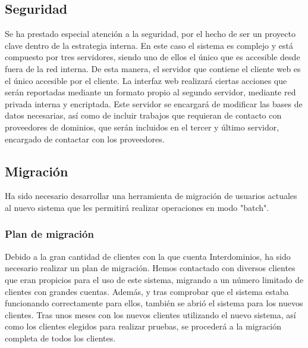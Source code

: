 \documentclass[12pt]{article}
\begin{document}
    \subsection{Seguridad}
      Se ha prestado especial atención a la seguridad, por el hecho de ser un proyecto clave dentro
      de la estrategia interna. En este caso el sistema es complejo y está compuesto por tres
      servidores, siendo uno de ellos el único que es accesible desde fuera de la red interna.
      De esta manera, el servidor que contiene el cliente web es el único accesible por el cliente.
      La interfaz web realizará ciertas acciones que serán reportadas mediante un formato propio al
      segundo servidor, mediante red privada interna y encriptada. Este servidor se encargará de
      modificar las bases de datos necesarias, así como de incluir trabajos que requieran de contacto
      con proveedores de dominios, que serán incluidos en el tercer y último servidor, encargado
      de contactar con los proveedores.
    \subsection{Migración}
      Ha sido necesario desarrollar una herramienta de migración de usuarios actuales al nuevo
      sistema que les permitirá realizar operaciones en modo "batch".
      \subsubsection{Plan de migración}
        Debido a la gran cantidad de clientes con la que cuenta Interdominios, ha sido necesario
        realizar un plan de migración. Hemos contactado con diversos clientes que eran propicios para
        el uso de este sistema, migrando a un número limitado de clientes con grandes cuentas. Además,
        y tras comprobar que el sistema estaba funcionando correctamente para ellos, también se abrió
        el sistema para los nuevos clientes. Tras unos meses con los nuevos clientes utilizando el
        nuevo sistema, así como los clientes elegidos para realizar pruebas, se procederá a la migración
        completa de todos los clientes.
\end{document}
